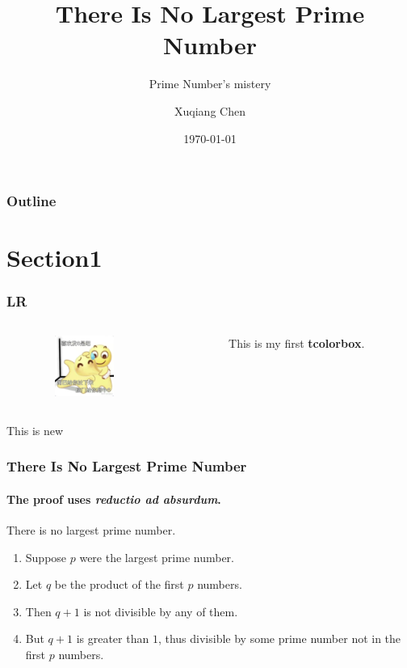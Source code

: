 \documentclass{beamer}
\title{There Is No Largest Prime Number}
\subtitle{Prime Number's mistery}
\date[\monthname]{\today}
\author[Travis]{Xuqiang Chen}
\institute{Beijing University of Technology}
\begin{document}
\begin{frame}
  \titlepage
\end{frame}


\begin{frame}
  \frametitle{Outline}
  \tableofcontents[pausesections]

\end{frame}



\section{Section1}

\begin{frame}
  \frametitle{LR}
  \begin{minipage}{\textwidth}
    \begin{columns}
      \begin{column}{0.3\textwidth}
        \begin{figure}
          \centering
          \includegraphics[width=3cm, height=2cm]{pic/1.png}
        \end{figure}
      \end{column}

      \begin{column}{0.7\textwidth}
        \begin{tcolorbox}[width=0.9\linewidth, height=2cm, colback=blue!10]
          This is my first \textbf{tcolorbox}.
        \end{tcolorbox}
      \end{column}
    \end{columns}
  \end{minipage}
  This is new
\end{frame}



\begin{frame}
  \frametitle{There Is No Largest Prime Number}
  \framesubtitle{The proof uses \textit{reductio ad absurdum}.}
  \begin{theorem}
    There is no largest prime number. \end{theorem}
  \begin{enumerate}
    \item<1-| alert@1> Suppose $p$ were the largest prime number.
    \item<2-> Let $q$ be the product of the first $p$ numbers.
    \item<3-> Then $q+1$ is not divisible by any of them.
    \item<1-> But $q + 1$ is greater than $1$, thus divisible by some prime
          number not in the first $p$ numbers.
  \end{enumerate}
\end{frame}
\end{document}

